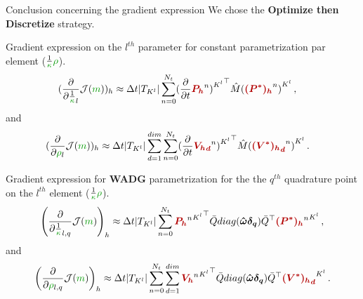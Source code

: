 \begin{frame}{Conclusion concerning the gradient expression}
  We chose the \textbf{Optimize then Discretize} strategy.


  \begin{overprint}
\begin{block}{Gradient expression on the $l^{th}$ parameter for constant parametrization par element ($\frac{1}{\bm}{\density}$).}
  \begin{align}
(\frac{\partial}{\partial \frac{1}{\bm}_l} \CF(\smodel))_h  &\approx \deltat \detJKl \sum_{n=0}^\nt  (\frac{\partial}{\partial t} {{\boldsymbol{\textcolor{\myred}{\scoefPolP}}^n)}^{\element^l}}^\top \MassRef  {(\boldsymbol{\textcolor{\myred}{\scoefAdjP}}^n)}^{\element^l}\,,
\end{align}
and
\begin{align}
(\frac{\partial}{\partial \density_l} \CF(\smodel))_h  &\approx \deltat \detJKl \sum_{d=1}^\dim \sum_{n=0}^\nt  (\frac{\partial}{\partial t} {{\boldsymbol{\textcolor{\myred}{\scoefPolVd}}^n)}^{\element^l}}^\top \MassRef  {(\boldsymbol{\textcolor{\myred}{\scoefAdjVd}}^n)}^{\element^l} \,.
\end{align}
\end{block}

\vspace{-0.3cm}
\begin{block}{Gradient expression for \textbf{WADG} parametrization for the the $q^{th}$ quadrature point on the $l^{th}$ element ($\frac{1}{\bm}{\density}$).}
  \begin{align}
\left(\frac{\partial}{\partial \frac{1}{\bm}_{l,q}} \CF(\smodel)\right)_h \approx  \deltat \detJKl \sum_{n=0}^\nt  {{\textcolor{\myred}{\coefPolP}^n}^{\element^l}}^\top \Pquad  diag(\weight \boldsymbol{\delta_q}) \Pquad^\top   {\textcolor{\myred}{\coefAdjP}^n}^{\element^l} \,,
\end{align}
and
\begin{align}
\left(\frac{\partial}{\partial \density_{l,q}} \CF(\smodel)\right)_h \approx \deltat \detJKl \sum_{n=0}^\nt \sum_{d=1}^\dim {{\textcolor{\myred}{\coefPolV}^n}^{\element^l}}^\top \Pquad diag(\weight \boldsymbol{\delta_q}) \Pquad^\top   \boldsymbol{\textcolor{\myred}{\scoefAdjVd}}^{\element^l} \,.
\end{align}
\end{block}
\end{overprint}

  \end{frame}
